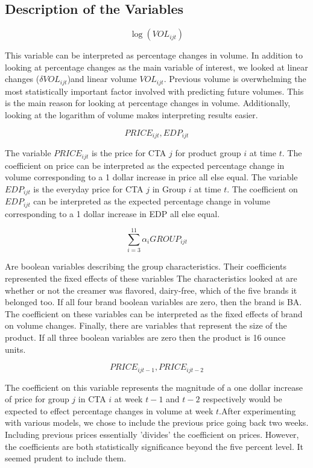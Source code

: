 \documentclass{article}
\begin{document}
\subsection{Description of the Variables}

$$\log( VOL_{ijt} )$$ 

This variable can be interpreted as percentage changes in volume. In addition to looking at percentage changes as the main variable of interest, we looked at linear changes ($\delta VOL_{ijt} $)and linear volume $VOL_{ijt}$. Previous volume is overwhelming the most statistically important factor involved with predicting future volumes. This is the main reason for looking at percentage changes in volume. Additionally, looking at the logarithm of volume makes interpreting results easier.

$${PRICE}_{ijt}, EDP_{ijt}$$ 

The variable ${PRICE}_{ijt}$ is the price for CTA $j$ for product group $i$ at time $t$. The coefficient on price can be interpreted as the expected percentage change in volume corresponding to a 1 dollar increase in price all else equal. The variable $EDP_{ijt}$ is the everyday price for CTA $j$ in Group $i$ at time $t$. The coefficient on $EDP_{ijt}$ can be interpreted as the expected percentage change in volume corresponding to a 1 dollar increase in EDP all else equal.

$$ \sum_{i=3}^{11} \alpha_i {GROUP}_{ijt} $$ 

Are boolean variables describing the group characteristics. Their coefficients represented the fixed effects of these variables The characteristics looked at are whether or not the creamer was flavored, dairy-free, which of the five brands it belonged too. If all four brand boolean variables are zero, then the brand is BA. The coefficient on these variables can be interpreted as the fixed effects of brand on volume changes. Finally, there are variables that represent the size of the product. If all three boolean variables are zero then the product is 16 ounce units.

$${PRICE}_{ijt-1}, {PRICE}_{ijt-2} $$

The coefficient on this variable represents the magnitude of a one dollar increase of price for group $j$ in CTA $i$ at week $t-1$ and $t-2$ respectively would be expected to effect percentage changes in volume at week $t$.After experimenting with various models, we chose to include the previous price going back two weeks. Including previous prices essentially 'divides' the coefficient on prices. However, the coefficients are both statistically significance beyond the five percent level. It seemed prudent to include them.
\end{document}
